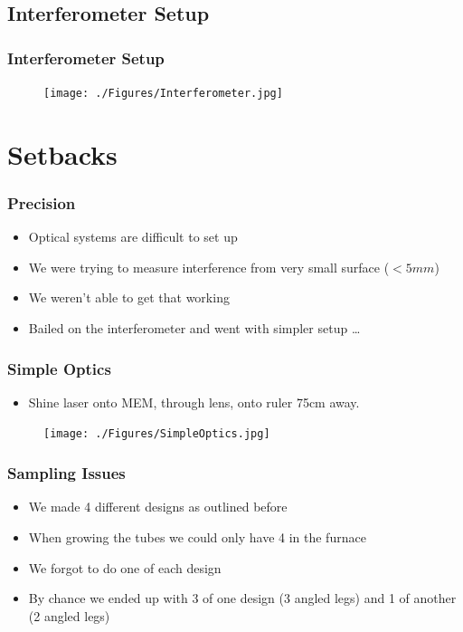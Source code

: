 \documentclass[11pt]{beamer}
\theoremstyle{definition}
\begin{document}
  \subsection{Interferometer Setup} \label{sub:interferometer_setup}

    \begin{frame} \frametitle{Interferometer Setup}
      \begin{figure}[ht]
            \centering
            \texttt{[image: ./Figures/Interferometer.jpg]}
            \label{fig:interferometer_design}
        \end{figure}
    \end{frame}

\section{Setbacks} \label{sec:setbacks}

  \begin{frame} \frametitle{Precision}
    \begin{itemize}[<+->]
      \item Optical systems are difficult to set up
      \item We were trying to measure interference from very small surface ($<5mm$)
      \item We weren't able to get that working
      \item Bailed on the interferometer and went with simpler setup \dots
    \end{itemize}
  \end{frame}

  \begin{frame} \frametitle{Simple Optics}
      \begin{itemize}[<+->]
        \item Shine laser onto MEM, through lens, onto ruler 75cm away.
      \end{itemize}
      \begin{figure}[ht]
          \centering
          \texttt{[image: ./Figures/SimpleOptics.jpg]}
          \label{fig:sharpie}
      \end{figure}
    \end{frame}

  \begin{frame} \frametitle{Sampling Issues}
    \begin{itemize}[<+->]
      \item We made 4 different designs as outlined before
      \item When growing the tubes we could only have 4 in the furnace
      \item We forgot to do one of each design
      \item By chance we ended up with 3 of one design (3 angled legs) and 1 of another (2 angled legs)
    \end{itemize}
  \end{frame}
\end{document}
